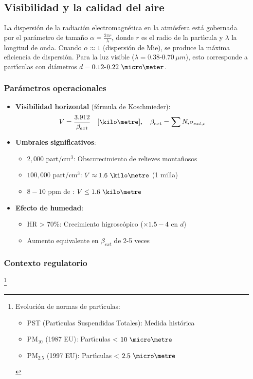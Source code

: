 \subsection{Visibilidad y la calidad del aire}

La dispersi\'on de la radiaci\'on electromagn\'etica en la atm\'osfera est\'a gobernada por el par\'ametro de tama\~no $\alpha = \frac{2\pi r}{\lambda}$, donde $r$ es el radio de la part\'{\i}cula y $\lambda$ la longitud de onda. Cuando $\alpha \approx 1$ (dispersi\'on de Mie), se produce la m\'axima eficiencia de dispersi\'on. Para la luz visible ($\lambda = 0.38$-$0.70\ \mu m$), esto corresponde a part\'{\i}culas con di\'ametros $d = 0.12$-$0.22\ \micro\meter$.
\subsubsection{Par\'ametros operacionales}
\begin{itemize}
    \item \textbf{Visibilidad horizontal} (f\'ormula de Koschmieder):\label{fKoschmieder}
    \begin{equation}
    V = \frac{3.912}{\beta_{ext}} \quad [\kilo\metre], \quad \beta_{ext} = \sum N_i\sigma_{ext,i}
    \end{equation}
    
    \item \textbf{Umbrales significativos}:
    \begin{itemize}
        \item $2,000$ part/cm$^3$: Obscurecimiento de relieves monta\~nosos
        \item $100,000$ part/cm$^3$: $V \approx 1.6\ \kilo\metre$ (1 milla)
        \item $8-10$ ppm de : $V \leq 1.6\ \kilo\metre$
    \end{itemize}
    
    \item \textbf{Efecto de humedad}:
    \begin{itemize}
        \item HR > 70\%: Crecimiento higrosc\'opico ($\times 1.5-4$ en $d$)
        \item Aumento equivalente en $\beta_{ext}$ de 2-5 veces
    \end{itemize}
\end{itemize}

\subsubsection{Contexto regulatorio}\footnote{
Evoluci\'on de normas de part\'{\i}culas:
\begin{itemize}
    \item PST (Part\'{\i}culas Suspendidas Totales): Medida hist\'orica
    \item PM$_{10}$ (1987 EU): Part\'{\i}culas < $10\ \micro\metre$ 
    \item PM$_{2.5}$ (1997 EU): Part\'{\i}culas < $2.5\ \micro\metre$
\end{itemize}
}

